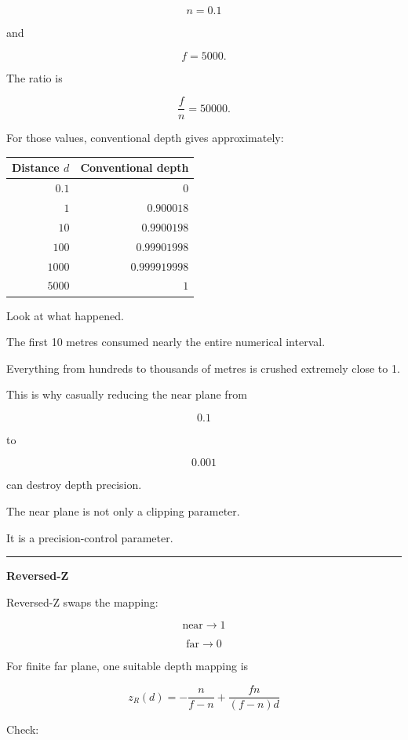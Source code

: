 \[
n=0.1
\]

and

\[
f=5000.
\]

The ratio is

\[
\frac fn=50000.
\]

For those values, conventional depth gives approximately:

{\def\LTcaptype{none} %
\begin{longtable}[]{@{}rr@{}}
\toprule\noalign{}
Distance \(d\) & Conventional depth \\
\midrule\noalign{}
\endhead
\bottomrule\noalign{}
\endlastfoot
\(0.1\) & \(0\) \\
\(1\) & \(0.900018\) \\
\(10\) & \(0.9900198\) \\
\(100\) & \(0.99901998\) \\
\(1000\) & \(0.999919998\) \\
\(5000\) & \(1\) \\
\end{longtable}
}

Look at what happened.

The first 10 metres consumed nearly the entire numerical interval.

Everything from hundreds to thousands of metres is crushed extremely close to 1.

This is why casually reducing the near plane from

\[
0.1
\]

to

\[
0.001
\]

can destroy depth precision.

The near plane is not only a clipping parameter.

It is a precision-control parameter.

\begin{center}\rule{0.5\linewidth}{0.5pt}\end{center}

\textbf{Reversed-Z}

Reversed-Z swaps the mapping:

\[
\boxed{
\text{near}\rightarrow1
}
\]

\[
\boxed{
\text{far}\rightarrow0
}
\]

For finite far plane, one suitable depth mapping is

\[
\boxed{
z_R(d)
=
-\frac{n}{f-n}
+
\frac{fn}{(f-n)d}
}
\]

Check:

